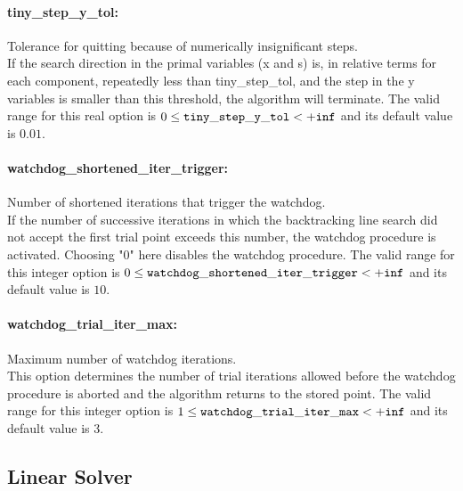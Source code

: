 \paragraph{tiny\_step\_y\_tol:}\label{sec:tiny_step_y_tol} Tolerance for quitting because of numerically insignificant steps. $\;$ \\
 If the search direction in the primal variables
(x and s) is, in relative terms for each
component, repeatedly less than tiny\_step\_tol,
and the step in the y variables is smaller than
this threshold, the algorithm will terminate. The valid range for this real option is 
$0 \le {\tt tiny\_step\_y\_tol } <  {\tt +inf}$
and its default value is $0.01$.


\paragraph{watchdog\_shortened\_iter\_trigger:}\label{sec:watchdog_shortened_iter_trigger} Number of shortened iterations that trigger the watchdog. $\;$ \\
 If the number of successive iterations in which
the backtracking line search did not accept the
first trial point exceeds this number, the
watchdog procedure is activated.  Choosing "0"
here disables the watchdog procedure. The valid range for this integer option is
$0 \le {\tt watchdog\_shortened\_iter\_trigger } <  {\tt +inf}$
and its default value is $10$.


\paragraph{watchdog\_trial\_iter\_max:}\label{sec:watchdog_trial_iter_max} Maximum number of watchdog iterations. $\;$ \\
 This option determines the number of trial
iterations allowed before the watchdog procedure
is aborted and the algorithm returns to the
stored point. The valid range for this integer option is
$1 \le {\tt watchdog\_trial\_iter\_max } <  {\tt +inf}$
and its default value is $3$.


\subsection{Linear Solver}
\label{sec:Linear_Solver}
